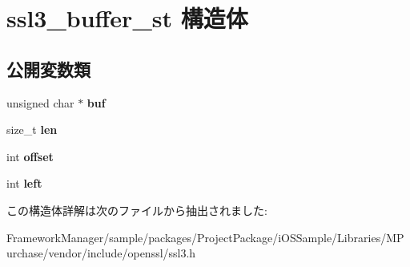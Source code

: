 \hypertarget{structssl3__buffer__st}{}\section{ssl3\+\_\+buffer\+\_\+st 構造体}
\label{structssl3__buffer__st}
\subsection*{公開変数類}
\begin{DoxyCompactItemize}
\item 
\hypertarget{structssl3__buffer__st_a7b769263d556c41433a8cb932dadd8f7}{}unsigned char $\ast$ {\bfseries buf}\label{structssl3__buffer__st_a7b769263d556c41433a8cb932dadd8f7}

\item 
\hypertarget{structssl3__buffer__st_adfe7ca1f516b5502e927d8731608085b}{}size\+\_\+t {\bfseries len}\label{structssl3__buffer__st_adfe7ca1f516b5502e927d8731608085b}

\item 
\hypertarget{structssl3__buffer__st_a9102947618e368b7454b8f3a32f8bf09}{}int {\bfseries offset}\label{structssl3__buffer__st_a9102947618e368b7454b8f3a32f8bf09}

\item 
\hypertarget{structssl3__buffer__st_a5332410a4d9c20e73fd3dd36699436cb}{}int {\bfseries left}\label{structssl3__buffer__st_a5332410a4d9c20e73fd3dd36699436cb}

\end{DoxyCompactItemize}


この構造体詳解は次のファイルから抽出されました\+:\begin{DoxyCompactItemize}
\item 
Framework\+Manager/sample/packages/\+Project\+Package/i\+O\+S\+Sample/\+Libraries/\+M\+Purchase/vendor/include/openssl/ssl3.\+h\end{DoxyCompactItemize}
